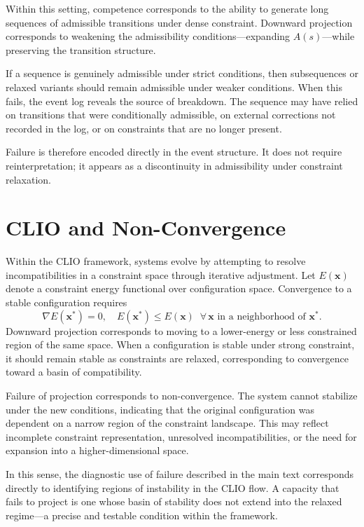 \documentclass[12pt, a4paper]{article}
\begin{document}
Within this setting, competence corresponds to the ability to generate long sequences of admissible transitions under dense constraint. Downward projection corresponds to weakening the admissibility conditions---expanding $A(s)$---while preserving the transition structure.

If a sequence is genuinely admissible under strict conditions, then subsequences or relaxed variants should remain admissible under weaker conditions. When this fails, the event log reveals the source of breakdown. The sequence may have relied on transitions that were conditionally admissible, on external corrections not recorded in the log, or on constraints that are no longer present.

Failure is therefore encoded directly in the event structure. It does not require reinterpretation; it appears as a discontinuity in admissibility under constraint relaxation.

\section{CLIO and Non-Convergence}

Within the CLIO framework, systems evolve by attempting to resolve incompatibilities in a constraint space through iterative adjustment. Let $E(\mathbf{x})$ denote a constraint energy functional over configuration space. Convergence to a stable configuration requires
\[
\nabla E(\mathbf{x}^*) = 0, \quad E(\mathbf{x}^*) \leq E(\mathbf{x}) \;\; \forall\, \mathbf{x} \text{ in a neighborhood of } \mathbf{x}^*.
\]
Downward projection corresponds to moving to a lower-energy or less constrained region of the same space. When a configuration is stable under strong constraint, it should remain stable as constraints are relaxed, corresponding to convergence toward a basin of compatibility.

Failure of projection corresponds to non-convergence. The system cannot stabilize under the new conditions, indicating that the original configuration was dependent on a narrow region of the constraint landscape. This may reflect incomplete constraint representation, unresolved incompatibilities, or the need for expansion into a higher-dimensional space.

In this sense, the diagnostic use of failure described in the main text corresponds directly to identifying regions of instability in the CLIO flow. A capacity that fails to project is one whose basin of stability does not extend into the relaxed regime---a precise and testable condition within the framework.
\end{document}
